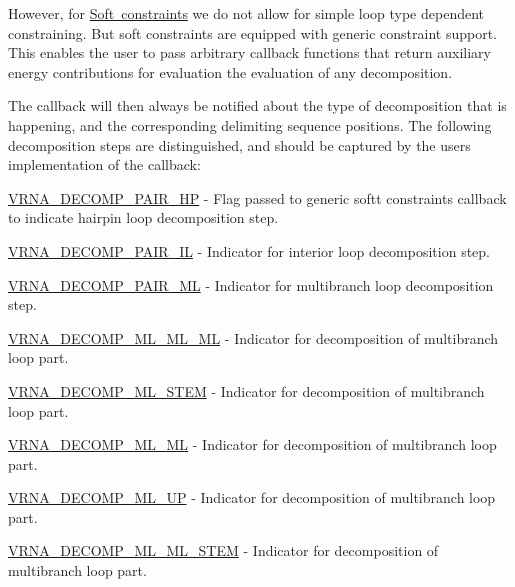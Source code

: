 However, for \mbox{\hyperlink{group__soft__constraints}{Soft constraints}} we do not allow for simple loop type dependent constraining. But soft constraints are equipped with generic constraint support. This enables the user to pass arbitrary callback functions that return auxiliary energy contributions for evaluation the evaluation of any decomposition.

The callback will then always be notified about the type of decomposition that is happening, and the corresponding delimiting sequence positions. The following decomposition steps are distinguished, and should be captured by the user\textquotesingle{}s implementation of the callback\+:


\begin{DoxyItemize}
\item \mbox{\hyperlink{group__constraints_ga8bd41ebc8039378d242e4e8c273716a5}{V\+R\+N\+A\+\_\+\+D\+E\+C\+O\+M\+P\+\_\+\+P\+A\+I\+R\+\_\+\+HP}} -\/ Flag passed to generic softt constraints callback to indicate hairpin loop decomposition step.
\item \mbox{\hyperlink{group__constraints_gaeab04f34d7730cff2d651d782f95d857}{V\+R\+N\+A\+\_\+\+D\+E\+C\+O\+M\+P\+\_\+\+P\+A\+I\+R\+\_\+\+IL}} -\/ Indicator for interior loop decomposition step.
\item \mbox{\hyperlink{group__constraints_gaa15b1185673f0b9e900c4748d45f388f}{V\+R\+N\+A\+\_\+\+D\+E\+C\+O\+M\+P\+\_\+\+P\+A\+I\+R\+\_\+\+ML}} -\/ Indicator for multibranch loop decomposition step.
\item \mbox{\hyperlink{group__constraints_ga735517266f2e35e1374b8f1ea77ef23e}{V\+R\+N\+A\+\_\+\+D\+E\+C\+O\+M\+P\+\_\+\+M\+L\+\_\+\+M\+L\+\_\+\+ML}} -\/ Indicator for decomposition of multibranch loop part.
\item \mbox{\hyperlink{group__constraints_ga4a23054c75d8efc785de50e3ea87602f}{V\+R\+N\+A\+\_\+\+D\+E\+C\+O\+M\+P\+\_\+\+M\+L\+\_\+\+S\+T\+EM}} -\/ Indicator for decomposition of multibranch loop part.
\item \mbox{\hyperlink{group__constraints_ga7f4cb9ff7a33e67f0539bd39e7b19a78}{V\+R\+N\+A\+\_\+\+D\+E\+C\+O\+M\+P\+\_\+\+M\+L\+\_\+\+ML}} -\/ Indicator for decomposition of multibranch loop part.
\item \mbox{\hyperlink{group__constraints_gae6478dda14e50e2f2cb9ef333a29256e}{V\+R\+N\+A\+\_\+\+D\+E\+C\+O\+M\+P\+\_\+\+M\+L\+\_\+\+UP}} -\/ Indicator for decomposition of multibranch loop part.
\item \mbox{\hyperlink{group__constraints_ga63d8ceb8c96ae3b463e529e28cc0fe98}{V\+R\+N\+A\+\_\+\+D\+E\+C\+O\+M\+P\+\_\+\+M\+L\+\_\+\+M\+L\+\_\+\+S\+T\+EM}} -\/ Indicator for decomposition of multibranch loop part.

\end{DoxyItemize}

